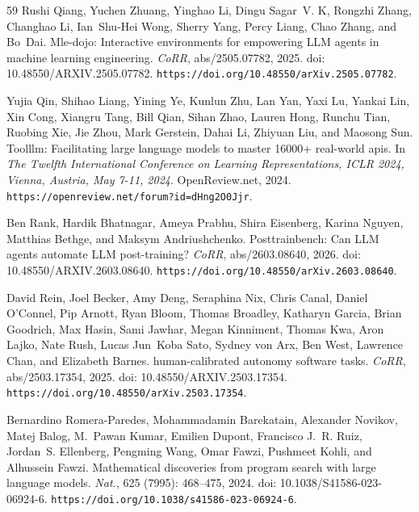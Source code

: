 \documentclass{llmxive}
\providecommand{\url}[1]{\texttt{#1}}
\providecommand{\doi}[1]{doi: #1}
\begin{document}
\begin{thebibliography}{59}
Rushi Qiang, Yuchen Zhuang, Yinghao Li, Dingu Sagar~V. K, Rongzhi Zhang, Changhao Li, Ian~Shu{-}Hei Wong, Sherry Yang, Percy Liang, Chao Zhang, and Bo~Dai.
\newblock Mle-dojo: Interactive environments for empowering {LLM} agents in machine learning engineering.
\newblock \emph{CoRR}, abs/2505.07782, 2025.
\newblock \doi{10.48550/ARXIV.2505.07782}.
\newblock \url{https://doi.org/10.48550/arXiv.2505.07782}.

Yujia Qin, Shihao Liang, Yining Ye, Kunlun Zhu, Lan Yan, Yaxi Lu, Yankai Lin, Xin Cong, Xiangru Tang, Bill Qian, Sihan Zhao, Lauren Hong, Runchu Tian, Ruobing Xie, Jie Zhou, Mark Gerstein, Dahai Li, Zhiyuan Liu, and Maosong Sun.
\newblock Toolllm: Facilitating large language models to master 16000+ real-world apis.
\newblock In \emph{The Twelfth International Conference on Learning Representations, {ICLR} 2024, Vienna, Austria, May 7-11, 2024}. OpenReview.net, 2024.
\newblock \url{https://openreview.net/forum?id=dHng2O0Jjr}.

Ben Rank, Hardik Bhatnagar, Ameya Prabhu, Shira Eisenberg, Karina Nguyen, Matthias Bethge, and Maksym Andriushchenko.
\newblock Posttrainbench: Can {LLM} agents automate {LLM} post-training?
\newblock \emph{CoRR}, abs/2603.08640, 2026.
\newblock \doi{10.48550/ARXIV.2603.08640}.
\newblock \url{https://doi.org/10.48550/arXiv.2603.08640}.

David Rein, Joel Becker, Amy Deng, Seraphina Nix, Chris Canal, Daniel O'Connel, Pip Arnott, Ryan Bloom, Thomas Broadley, Katharyn Garcia, Brian Goodrich, Max Hasin, Sami Jawhar, Megan Kinniment, Thomas Kwa, Aron Lajko, Nate Rush, Lucas Jun~Koba Sato, Sydney von Arx, Ben West, Lawrence Chan, and Elizabeth Barnes.
 human-calibrated autonomy software tasks.
\newblock \emph{CoRR}, abs/2503.17354, 2025.
\newblock \doi{10.48550/ARXIV.2503.17354}.
\newblock \url{https://doi.org/10.48550/arXiv.2503.17354}.

Bernardino Romera{-}Paredes, Mohammadamin Barekatain, Alexander Novikov, Matej Balog, M.~Pawan Kumar, Emilien Dupont, Francisco J.~R. Ruiz, Jordan~S. Ellenberg, Pengming Wang, Omar Fawzi, Pushmeet Kohli, and Alhussein Fawzi.
\newblock Mathematical discoveries from program search with large language models.
\newblock \emph{Nat.}, 625 (7995): 468--475, 2024.
\newblock \doi{10.1038/S41586-023-06924-6}.
\newblock \url{https://doi.org/10.1038/s41586-023-06924-6}.


\end{thebibliography}
\end{document}
